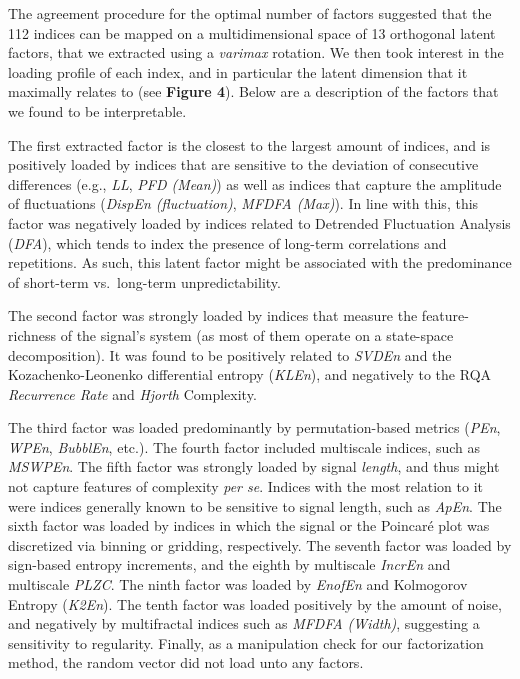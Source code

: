 \documentclass[
  man]{apa6}
\begin{document}
The agreement procedure for the optimal number of factors suggested that the 112 indices can be mapped on a multidimensional space of 13 orthogonal latent factors, that we extracted using a \emph{varimax} rotation. We then took interest in the loading profile of each index, and in particular the latent dimension that it maximally relates to (see \textbf{Figure 4}). Below are a description of the factors that we found to be interpretable.

The first extracted factor is the closest to the largest amount of indices, and is positively loaded by indices that are sensitive to the deviation of consecutive differences (e.g., \emph{LL}, \emph{PFD (Mean)}) as well as indices that capture the amplitude of fluctuations (\emph{DispEn (fluctuation)}, \emph{MFDFA (Max)}). In line with this, this factor was negatively loaded by indices related to Detrended Fluctuation Analysis (\emph{DFA}), which tends to index the presence of long-term correlations and repetitions. As such, this latent factor might be associated with the predominance of short-term vs.~long-term unpredictability.

The second factor was strongly loaded by indices that measure the feature-richness of the signal's system (as most of them operate on a state-space decomposition). It was found to be positively related to \emph{SVDEn} and the Kozachenko-Leonenko differential entropy (\emph{KLEn}), and negatively to the RQA \emph{Recurrence Rate} and \emph{Hjorth} Complexity.

The third factor was loaded predominantly by permutation-based metrics (\emph{PEn}, \emph{WPEn}, \emph{BubblEn}, etc.). The fourth factor included multiscale indices, such as \emph{MSWPEn}. The fifth factor was strongly loaded by signal \emph{length}, and thus might not capture features of complexity \emph{per se}. Indices with the most relation to it were indices generally known to be sensitive to signal length, such as \emph{ApEn}. The sixth factor was loaded by indices in which the signal or the Poincaré plot was discretized via binning or gridding, respectively. The seventh factor was loaded by sign-based entropy increments, and the eighth by multiscale \emph{IncrEn} and multiscale \emph{PLZC}. The ninth factor was loaded by \emph{EnofEn} and Kolmogorov Entropy (\emph{K2En}). The tenth factor was loaded positively by the amount of noise, and negatively by multifractal indices such as \emph{MFDFA (Width)}, suggesting a sensitivity to regularity. Finally, as a manipulation check for our factorization method, the random vector did not load unto any factors.
\end{document}
